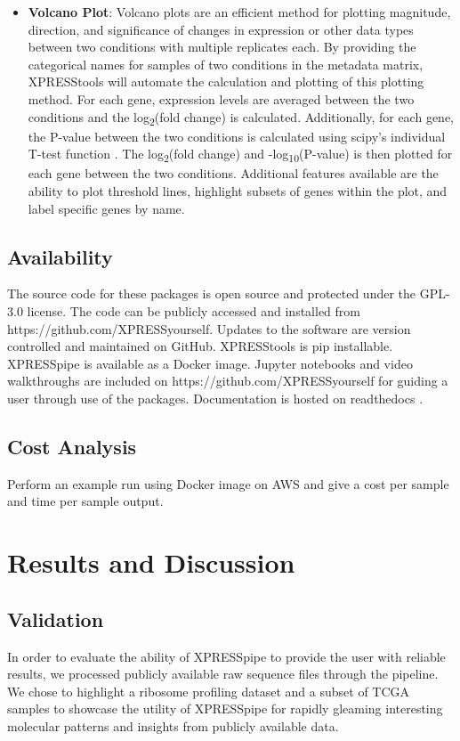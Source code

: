\documentclass[11pt, a4paper, oneside]{article}
\begin{document}
\begin{itemize}
  \item \textbf{Volcano Plot}: Volcano plots are an efficient method for plotting magnitude, direction, and significance of changes in expression or other data types between two conditions with multiple replicates each. By providing the categorical names for samples of two conditions in the metadata matrix, XPRESStools will automate the calculation and plotting of this plotting method. For each gene, expression levels are averaged between the two conditions and the log\textsubscript{2}(fold change) is calculated. Additionally, for each gene, the P-value between the two conditions is calculated using scipy's individual T-test function \cite{scipy}. The log\textsubscript{2}(fold change) and -log\textsubscript{10}(P-value) is then plotted for each gene between the two conditions. Additional features available are the ability to plot threshold lines, highlight subsets of genes within the plot, and label specific genes by name.

\end{itemize}

\subsection{Availability}
The source code for these packages is open source and protected under the GPL-3.0 license. The code can be publicly accessed and installed from https://github.com/XPRESSyourself. Updates to the software are version controlled and maintained on GitHub. XPRESStools is pip installable. XPRESSpipe is available as a Docker image. Jupyter notebooks and video walkthroughs are included on https://github.com/XPRESSyourself for guiding a user through use of the packages. Documentation is hosted on readthedocs \cite{readthedocs}.

\subsection{Cost Analysis}
Perform an example run using Docker image on AWS and give a cost per sample and time per sample output.


\section{Results and Discussion}

\subsection{Validation}
In order to evaluate the ability of XPRESSpipe to provide the user with reliable results, we processed publicly available raw sequence files through the pipeline. We chose to highlight a ribosome profiling dataset and a subset of TCGA samples to showcase the utility of XPRESSpipe for rapidly gleaming interesting molecular patterns and insights from publicly available data.
\end{document}

